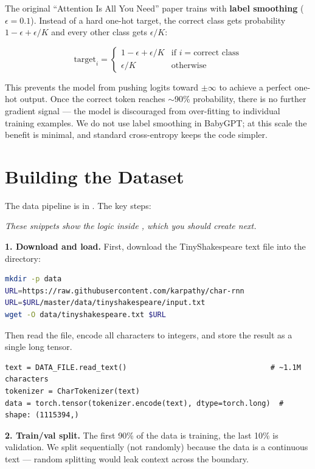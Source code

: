 The original ``Attention Is All You Need'' paper trains with \textbf{label smoothing} ($\epsilon = 0.1$). Instead of a hard one-hot target, the correct class gets probability $1 - \epsilon + \epsilon/K$ and every other class gets $\epsilon/K$:

\[\text{target}_i = \begin{cases} 1 - \epsilon + \epsilon / K & \text{if } i = \text{correct class} \\ \epsilon / K & \text{otherwise} \end{cases}\]

This prevents the model from pushing logits toward $\pm\infty$ to achieve a perfect one-hot output. Once the correct token reaches $\sim$90\% probability, there is no further gradient signal --- the model is discouraged from over-fitting to individual training examples. We do not use label smoothing in BabyGPT; at this scale the benefit is minimal, and standard cross-entropy keeps the code simpler.

\section{Building the Dataset}

The data pipeline is in . The key steps:

{\small\itshape These snippets show the logic inside , which you should create next.}

\textbf{1. Download and load.} First, download the TinyShakespeare text file into the  directory:

\shelltag
\begin{lstlisting}[language=bash]
mkdir -p data
URL=https://raw.githubusercontent.com/karpathy/char-rnn
URL=$URL/master/data/tinyshakespeare/input.txt
wget -O data/tinyshakespeare.txt $URL
\end{lstlisting}

Then read the file, encode all characters to integers, and store the result as a single long tensor.

\concepttag
\begin{lstlisting}
text = DATA_FILE.read_text()                                 # ~1.1M characters
tokenizer = CharTokenizer(text)
data = torch.tensor(tokenizer.encode(text), dtype=torch.long)  # shape: (1115394,)
\end{lstlisting}

\textbf{2. Train/val split.} The first 90\% of the data is training, the last 10\% is validation. We split sequentially (not randomly) because the data is a continuous text --- random splitting would leak context across the boundary.

